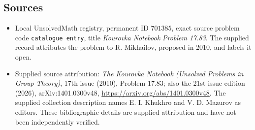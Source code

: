 \documentclass[11pt]{article}
\begin{document}
\subsection{Sources}
\begin{itemize}
\item Local UnsolvedMath registry, permanent ID \(701385\), exact source problem code \texttt{catalogue entry}, title \emph{Kourovka Notebook Problem 17.83}. The supplied record attributes the problem to R. Mikhailov, proposed in 2010, and labels it open.
\item Supplied source attribution: \emph{The Kourovka Notebook (Unsolved Problems in Group Theory)}, 17th issue (2010), Problem 17.83; also the 21st issue edition (2026), arXiv:1401.0300v48, \url{https://arxiv.org/abs/1401.0300v48}. The supplied collection description names E. I. Khukhro and V. D. Mazurov as editors. These bibliographic details are supplied attribution and have not been independently verified.
\end{itemize}
\end{document}
